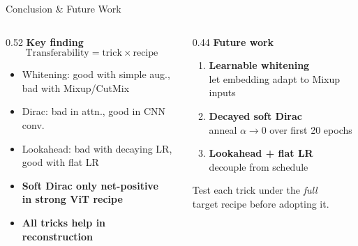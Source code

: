 \documentclass[aspectratio=169]{beamer}
\newcommand{\good}[1]{{\color{pos}\textbf{#1}}}
\begin{document}
\begin{frame}{Conclusion \& Future Work}
\begin{columns}
\begin{column}{0.52\textwidth}
    \textbf{Key finding}
    \[
        \text{Transferability} = \text{trick} \times \text{recipe}
    \]
    \vspace{0.3em}
    \begin{itemize}
        \item Whitening: good with simple aug.,\\
              bad with Mixup/CutMix
        \item Dirac: bad in attn., good in CNN conv.
        \item Lookahead: bad with decaying LR,\\
              good with flat LR
        \item \good{Soft Dirac only net-positive\\in strong ViT recipe}
        \item \good{All tricks help in reconstruction}
    \end{itemize}
\end{column}
\begin{column}{0.44\textwidth}
    \textbf{Future work}
    \vspace{0.5em}
    \begin{enumerate}
        \item \textbf{Learnable whitening}\\
              {\small let embedding adapt to Mixup inputs}
        \item \textbf{Decayed soft Dirac}\\
              {\small anneal $\alpha \to 0$ over first 20 epochs}
        \item \textbf{Lookahead + flat LR}\\
              {\small decouple from schedule}
    \end{enumerate}
    \vspace{0.5em}
    {\small Test each trick under the \emph{full}\\
    target recipe before adopting it.}
\end{column}
\end{columns}
\end{frame}
\end{document}
